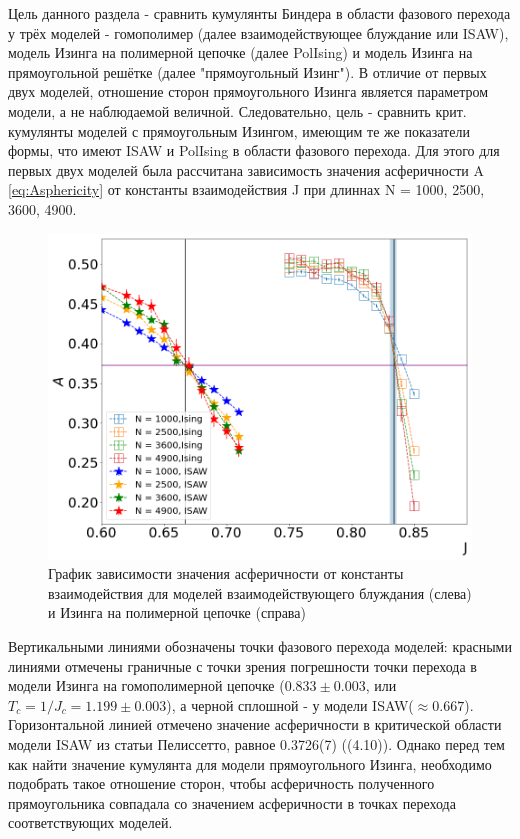 Цель данного раздела - сравнить кумулянты Биндера в области фазового перехода у трёх моделей - гомополимер (далее взаимодействующее блуждание или ISAW), модель Изинга на полимерной цепочке (далее PolIsing) и модель Изинга на прямоугольной решётке (далее "прямоугольный Изинг"). В отличие от первых двух моделей, отношение сторон прямоугольного Изинга является параметром модели, а не наблюдаемой величной. Следовательно, цель - сравнить крит. кумулянты моделей с прямоугольным Изингом, имеющим те же показатели формы, что имеют ISAW и PolIsing в области фазового перехода. 
Для этого для первых двух моделей была рассчитана зависимость значения асферичности A \eqref{eq:Asphericity} от константы взаимодействия J при длиннах N = 1000, 2500, 3600, 4900.
\newpage
\begin{figure}[h!]
    \centering
    \includegraphics[width=150mm]{Sections/Images/Ising_ISAW_A_J_Full.png}
    \caption{График зависимости значения асферичности от константы взаимодействия для моделей взаимодействующего блуждания (слева) и Изинга на полимерной цепочке (справа)}
    \label{fig:A_J}
\end{figure}

Вертикальными линиями обозначены точки фазового перехода моделей: красными линиями отмечены граничные с точки зрения погрешности точки перехода в модели Изинга на гомополимерной цепочке ($0.833 \pm 0.003$, или $T_{c}=1/J_{c} = 1.199\pm0.003$\cite{Foster}), а черной сплошной - у модели ISAW($\approx 0.667$\cite{Pelissetto}). Горизонтальной линией отмечено значение асферичности в критической области модели ISAW из статьи Пелиссетто, равное 0.3726(7) ((4.10)\cite{Pelissetto}). Однако перед тем как найти значение кумулянта для модели прямоугольного Изинга, необходимо подобрать такое отношение сторон, чтобы асферичность полученного прямоугольника совпадала со значением асферичности в точках перехода соответствующих моделей.

